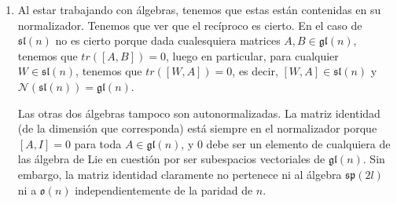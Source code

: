 \documentclass[twoside]{article}
\begin{document}
\begin{solucion}
\begin{enumerate}
\item Al estar trabajando con álgebras, tenemos que estas están contenidas en su normalizador. Tenemos que ver que el recíproco es cierto. En el caso de $\mathfrak{sl}(n)$ no es cierto porque dada cualesquiera matrices $A,B\in\mathfrak{gl}(n)$, tenemos que $tr([A,B])=0$, luego en particular, para cualquier $W\in \mathfrak{sl}(n)$, tenemos que $tr([W,A])=0$, es decir, $[W,A]\in\mathfrak{sl}(n)$ y $\mathcal{N}(\mathfrak{sl}(n))=\mathfrak{gl}(n)$. %

Las otras dos álgebras tampoco son autonormalizadas. La matriz identidad (de la dimensión que corresponda) está siempre en el normalizador porque $[A,I]=0$ para toda $A\in\mathfrak{gl}(n)$, y $0$ debe ser un elemento de cualquiera de las álgebra de Lie en cuestión por ser subespacios vectoriales de $\mathfrak{gl}(n)$. Sin embargo, la matriz identidad claramente no pertenece ni al álgebra $\mathfrak{sp}(2l)$ ni a $\mathfrak{o}(n)$ independientemente de la paridad de $n$.

%



\end{enumerate}
\end{solucion}
\end{document}

